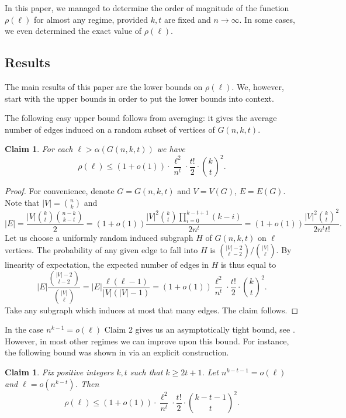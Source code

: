 \documentclass[12pt,a4paper]{article}
\newtheorem{Claim}[Theorem]{Claim}
\begin{document}
In this paper, we managed to determine the order of magnitude of the function $\rho(\ell)$ for almost any regime, provided $k,t$ are fixed and $n\to\infty.$ In some cases, we even determined the exact value of $\rho(\ell).$



\subsection{Results}

The main results of this paper are the lower bounds on $\rho(\ell)$. We, however, start with the upper bounds in order to put the lower bounds into context. 

The following easy upper bound follows from averaging: it gives the average number of edges induced on a random subset of vertices of $G(n,k,t)$.
\begin{Claim}\label{cla2}
For each $\ell > \alpha(G(n,k,t))$ we have
$$
\rho(\ell) \leqslant(1+o(1)) \cdot \frac{\ell^{2}}{n^{t}} \cdot \frac{t!}{2} \cdot \binom{k}{t}^2.
$$
\end{Claim}

\begin{proof}
    For convenience, denote $G=G(n,k,t)$ and $V = V(G)$, $E = E(G)$. Note that $|V| = \binom{n}{k}$ and 
    $$|E| = \frac{|V|\binom{k}{t}\binom{n-k}{k-t}}{2} =(1+o(1)) \frac{|V|^2\binom{k}{t}\prod_{i=0}^{k-t+1}(k-i)}{2 n^t}=(1+o(1)) \frac{|V|^2\binom{k}{t}^2}{2 n^t t!}.$$
    Let us choose a uniformly random induced subgraph $H$ of $G(n,k,t)$ on $\ell$ vertices. The probability of any given edge to fall into $H$ is ${|V|-2\choose \ell-2}/{|V|\choose \ell}$. By linearity of expectation, the expected number of edges in $H$ is thus equal to 
    $$|E|\frac{\binom{|V|-2}{l-2}}{\binom{|V|}{\ell}}=|E|\frac{\ell(\ell-1)}{|V|(|V|-1)} =(1+o(1)) \frac{\ell^{2}}{n^{t}} \cdot \frac{t!}{2} \cdot \binom{k}{t}^2.$$
    Take any subgraph which induces at most that many edges. The claim follows.
\end{proof}

In the case $n^{k-1} = o(\ell)$ Claim 2 gives us an asymptotically tight bound, see \cite{YS}. However, in most other regimes we can improve upon this bound. For instance, the following bound was shown in \cite{YS} via an explicit construction.

\begin{Claim}\label{cla3}
Fix positive integers $k,t$ such that $k \geqslant 2t+1$. Let $n^{k-t-1} = o(\ell)$ and $\ell = o (n^{k-t})$. Then
$$
\rho(\ell) \leqslant(1+o(1)) \cdot \frac{\ell^{2}}{n^{t}} \cdot \frac{t!}{2} \cdot \binom{k-t-1}{t}^2.
$$
\end{Claim}
\end{document}
